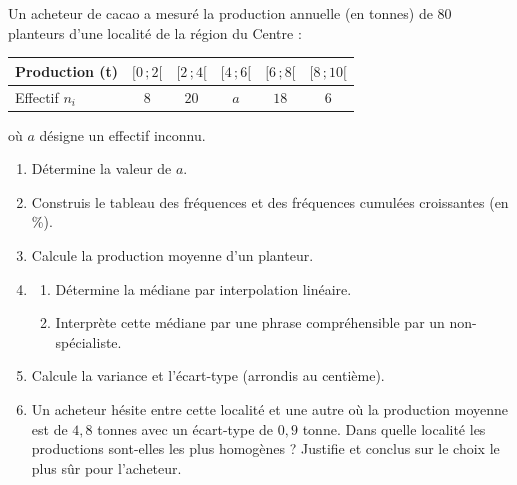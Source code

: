 \documentclass[11pt]{article}
\begin{document}
\begin{exercice}
Un acheteur de cacao a mesuré la production annuelle (en tonnes) de $80$ planteurs d'une localité de la région du Centre :
\begin{center}
\begin{tabular}{|l|ccccc|}
\hline
\rowcolor{popblueL} Production (t) & $[0\,; 2[$ & $[2\,; 4[$ & $[4\,; 6[$ & $[6\,; 8[$ & $[8\,; 10[$ \\
\hline
Effectif $n_i$ & $8$ & $20$ & $a$ & $18$ & $6$ \\
\hline
\end{tabular}
\end{center}
où $a$ désigne un effectif inconnu.
\begin{enumerate}
\item Détermine la valeur de $a$.
\item Construis le tableau des fréquences et des fréquences cumulées croissantes (en \%).
\item Calcule la production moyenne d'un planteur.
\item \begin{enumerate}
\item Détermine la médiane par interpolation linéaire.
\item Interprète cette médiane par une phrase compréhensible par un non-spécialiste.
\end{enumerate}
\item Calcule la variance et l'écart-type (arrondis au centième).
\item Un acheteur hésite entre cette localité et une autre où la production moyenne est de $4,8$ tonnes avec un écart-type de $0,9$ tonne. Dans quelle localité les productions sont-elles les plus homogènes ? Justifie et conclus sur le choix le plus sûr pour l'acheteur.
\end{enumerate}
\end{exercice}
\end{document}
